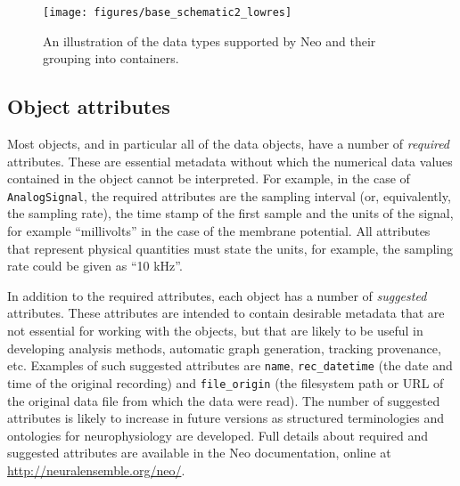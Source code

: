 \documentclass{frontiers}
\newcommand{\documentation}{\url{http://neuralensemble.org/neo/}}
\begin{document}
\begin{figure}
\centering
\texttt{[image: figures/base\_schematic2\_lowres]}
\caption{An illustration of the data types supported by Neo and their grouping into containers.}\label{fig:overview} 
\end{figure}
%
%
%


\subsection{Object attributes}

Most objects, and in particular all of the data objects, have a number of \emph{required} attributes.
These are essential metadata without which the numerical data values contained in the object cannot be interpreted.
For example, in the case of \lstinline`AnalogSignal`, the required attributes are the sampling interval (or, equivalently, the sampling rate), the time stamp of the first sample and the units of the signal, for example ``millivolts'' in the case of the membrane potential. 
All attributes that represent physical quantities must state the units, for example, the sampling rate could be given as ``10 kHz''.

In addition to the required attributes, each object has a number of \emph{suggested} attributes.
These attributes are intended to contain desirable metadata that are not essential for working with the objects, but that are likely to be useful in developing analysis methods, automatic graph generation, tracking provenance, etc.
Examples of such suggested attributes are \lstinline`name`, \lstinline`rec_datetime` (the date and time of the original recording) and \lstinline`file_origin` (the filesystem path or URL of the original data file from which the data were read).
The number of suggested attributes is likely to increase in future versions as structured terminologies and ontologies for neurophysiology are developed.
Full details about required and suggested attributes are available in the Neo documentation, online at \documentation.
\end{document}
